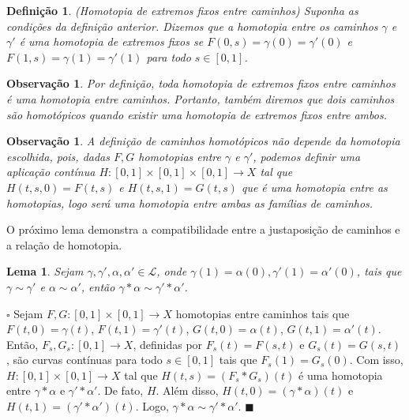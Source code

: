 \documentclass[12pt]{book}
\newtheorem{lema}[teorema]{Lema}
\newtheorem{definicao}[teorema]{Definição}
\newtheorem{observacao}[teorema]{Observação}
\newenvironment{prova}[1]{$\square$ #1}{\hfill$\blacksquare$}
\newcommand{\caminhos}{\mathcal{L}}
\newcommand{\intervalo}{[0,1]}
\begin{document}
	\begin{definicao}\label{definicao_homotopia_extremos_fixos}
		(Homotopia de extremos fixos entre caminhos) Suponha as condições da definição anterior. Dizemos que a homotopia entre os caminhos $\gamma$ e $\gamma'$ é uma homotopia de extremos fixos se $F(0,s) = \gamma(0) = \gamma'(0)$ e $F(1,s) = \gamma(1) = \gamma'(1)$ para todo $s\in \intervalo$.
	\end{definicao}
	
	\begin{observacao}
		Por definição, toda homotopia de extremos fixos entre caminhos é uma homotopia entre caminhos. Portanto, também diremos que dois caminhos são homotópicos quando existir uma homotopia de extremos fixos entre ambos.
	\end{observacao}
	
	\begin{observacao}
		A definição de caminhos homotópicos não depende da homotopia escolhida, pois, dadas $F,G$ homotopias entre $\gamma$ e $\gamma'$, podemos definir uma aplicação contínua $H: [0,1] \times [0,1] \times [0,1] \to X$ tal que $H(t,s ,0) = F(t,s)$ e $H(t,s, 1) = G(t,s)$ que é uma homotopia entre as homotopias, logo será uma homotopia entre ambas as famílias de caminhos.
	\end{observacao}
	
	O próximo lema demonstra a compatibilidade entre a justaposição de caminhos e a relação de homotopia.
	
	\begin{lema}\label{lema_compatibilidade_produto_caminhos}
		Sejam $\gamma, \gamma', \alpha, \alpha' \in \caminhos$, onde $\gamma(1) = \alpha(0), \gamma'(1) = \alpha'(0) $, tais que $\gamma \sim \gamma'$ e $\alpha \sim \alpha'$, então $\gamma * \alpha \sim \gamma' * \alpha'$.
	\end{lema}
	\begin{prova}
		Sejam  $F, G:[0,1] \times [0,1] \to X$ homotopias entre caminhos tais que $F(t,0)=\gamma(t)$, $F(t,1)=\gamma'(t)$, $G(t,0)=\alpha(t)$, $G(t,1)=\alpha'(t)$. Então, $F_{s}, G_{s}:\intervalo \to X$, definidas por $F_{s}(t) = F(s,t)$ e $G_{s}(t) = G(s,t)$, são curvas contínuas para todo $s \in \intervalo$ tais que $F_{s}(1) = G_{s}(0)$. Com isso, $H :\intervalo\times \intervalo\to X$ tal que $H(t, s)=(F_{s}*G_{s})(t)$ é uma homotopia entre $\gamma*\alpha$ e $\gamma'*\alpha'$. De fato, $H$. Além disso, $H(t, 0) = (\gamma*\alpha)(t)$ e $H(t, 1) = (\gamma'*\alpha')(t)$. Logo, $\gamma*\alpha \sim \gamma'*\alpha'$.
	\end{prova}
	
\end{document}

